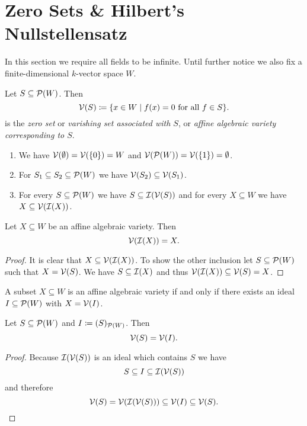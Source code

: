 \section{Zero Sets \& Hilbert’s Nullstellensatz}
In this section we require all fields to be infinite. Until further notice we also fix a finite-dimensional $k$-vector space $W$.


\begin{defi}
  Let $S \subseteq \mathcal{P}(W)$. Then
  \[
    \mathcal{V}(S) \coloneqq \{x \in W \mid f(x) = 0 \text{ for all } f \in S\}.
  \]
  is the \emph{zero set} or \emph{varishing set associated with $S$}, or \emph{affine algebraic variety corresponding to $S$}.
\end{defi}


\begin{expls}
  \begin{enumerate}[label=\emph{\alph*)},leftmargin=*]
    \item
      We have $\mathcal{V}(\emptyset) = \mathcal{V}(\{0\}) = W$ and $\mathcal{V}(\mathcal{P}(W)) = \mathcal{V}(\{1\}) = \emptyset$.
    \item
      For $S_1 \subseteq S_2 \subseteq \mathcal{P}(W)$ we have $\mathcal{V}(S_2) \subseteq \mathcal{V}(S_1)$.
    \item
      For every $S \subseteq \mathcal{P}(W)$ we have $S \subseteq \mathcal{I}(\mathcal{V}(S))$ and for every $X \subseteq W$ we have $X \subseteq \mathcal{V}(\mathcal{I}(X))$.
  \end{enumerate}
\end{expls}


\begin{lem}
  Let $X \subseteq W$ be an affine algebraic variety. Then
  \[
    \mathcal{V}(\mathcal{I}(X)) = X.
  \]
\end{lem}
\begin{proof}
  It is clear that $X \subseteq \mathcal{V}(\mathcal{I}(X))$. To show the other inclusion let $S \subseteq \mathcal{P}(W)$ such that $X = \mathcal{V}(S)$. We have $S \subseteq \mathcal{I}(X)$ and thus $\mathcal{V}(\mathcal{I}(X)) \subseteq \mathcal{V}(S) = X$.
\end{proof}


\begin{cor}
  A subset $X \subseteq W$ is an affine algebraic variety if and only if there exists an ideal $I \subseteq \mathcal{P}(W)$ with $X = \mathcal{V}(I)$.
\end{cor}



\begin{cor}
  Let $S \subseteq \mathcal{P}(W)$ and $I \coloneqq (S)_{\mathcal{P}(W)}$. Then
  \[
    \mathcal{V}(S) = \mathcal{V}(I).
  \]
\end{cor}
\begin{proof}
  Because $\mathcal{I}(\mathcal{V}(S))$ is an ideal which contains $S$ we have
  \[
    S \subseteq I \subseteq \mathcal{I}(\mathcal{V}(S))
  \]
  and therefore
  \[
    \mathcal{V}(S) = \mathcal{V}(\mathcal{I}(\mathcal{V}(S))) \subseteq \mathcal{V}(I) \subseteq \mathcal{V}(S).
    \qedhere
  \]
\end{proof}


